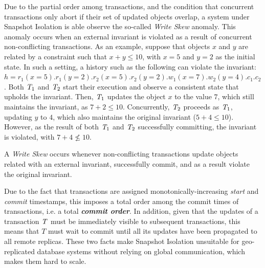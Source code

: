 Due to the partial order among transactions, and the condition that concurrent transactions only abort if their set of updated objects overlap, a system under Snapshot Isolation is able observe the so-called \emph{Write Skew} anomaly. This anomaly occurs when an external invariant is violated as a result of concurrent non-conflicting transactions. As an example, suppose that objects $x$ and $y$ are related by a constraint such that $x + y \le 10$, with $x = 5$ and $y = 2$ as the initial state. In such a setting, a history such as the following can violate the invariant: $h = r_1(x=5).r_1(y=2).r_2(x=5).r_2(y=2).w_1(x=7).w_2(y=4).c_1.c_2$. Both $\mathit{T}_1$ and $\mathit{T}_2$ start their execution and observe a consistent state that upholds the invariant. Then, $\mathit{T}_1$ updates the object $x$ to the value $7$, which still maintains the invariant, as $7 + 2 \le 10$. Concurrently, $\mathit{T}_2$ proceeds as $\mathit{T}_1$, updating $y$ to $4$, which also maintains the original invariant ($5 + 4 \le 10$). However, as the result of both $\mathit{T}_1$ and $\mathit{T}_2$ successfully committing, the invariant is violated, with $7 + 4 \not\le 10$.




\begin{definition}
A \emph{Write Skew} occurs whenever non-conflicting transactions update objects related with an external invariant, successfully commit, and as a result violate the original invariant.
\end{definition}

Due to the fact that transactions are assigned monotonically-increasing \emph{start} and \emph{commit} timestamps, this imposes a total order among the commit times of transactions, i.e. a total \textbf{\em commit order}. In addition, given that the updates of a transaction $\mathit{T}$ must be immediately visible to subsequent transactions, this means that $T$ must wait to commit until all its updates have been propagated to all remote replicas. These two facts make Snapshot Isolation unsuitable for geo-replicated database systems without relying on global communication, which makes them hard to scale.

